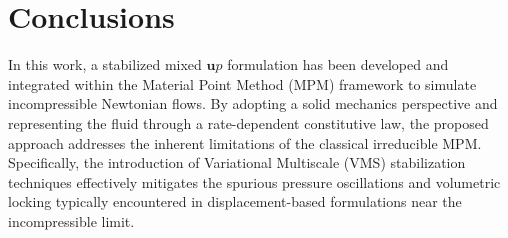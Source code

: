 \documentclass[11pt,english]{article}
\def\up{$\boldsymbol{u}p$\xspace}
\begin{document}






\section{Conclusions} \label{sec:Conclusions}

In this work, a stabilized mixed \up formulation has been developed and integrated within the Material Point Method (MPM) framework to simulate incompressible Newtonian flows. By adopting a solid mechanics perspective and representing the fluid through a rate-dependent constitutive law, the proposed approach addresses the inherent limitations of the classical irreducible MPM. Specifically, the introduction of Variational Multiscale (VMS) stabilization techniques effectively mitigates the spurious pressure oscillations and volumetric locking typically encountered in displacement-based formulations near the incompressible limit.
\end{document}
